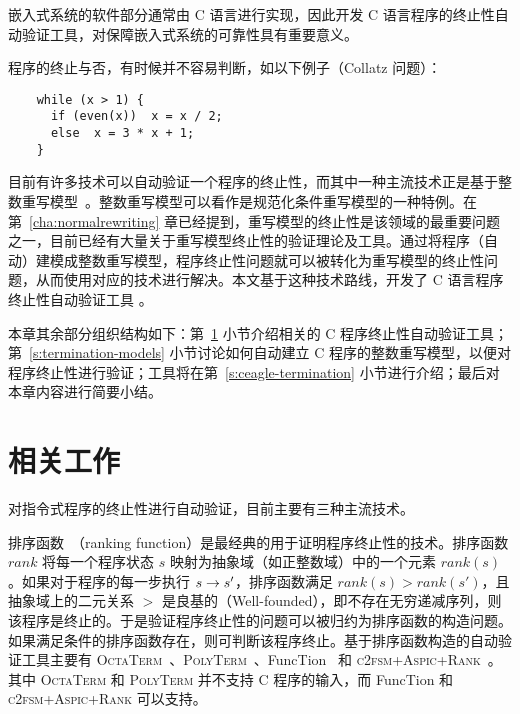 嵌入式系统的软件部分通常由 C 语言进行实现，因此开发 C 语言程序的终止性自动验证工具，对保障嵌入式系统的可靠性具有重要意义。

程序的终止与否，有时候并不容易判断，如以下例子（Collatz 问题）：
\begin{verbatim}
    while (x > 1) {
      if (even(x))  x = x / 2;
      else  x = 3 * x + 1;
    }
\end{verbatim}
目前有许多技术可以自动验证一个程序的终止性，而其中一种主流技术正是基于整数重写模型~\cite{DBLP:conf/rta/FalkeKS11}。整数重写模型可以看作是规范化条件重写模型的一种特例。在第~\ref{cha:normalrewriting} 章已经提到，重写模型的终止性是该领域的最重要问题之一，目前已经有大量关于重写模型终止性的验证理论及工具。通过将程序（自动）建模成整数重写模型，程序终止性问题就可以被转化为重写模型的终止性问题，从而使用对应的技术进行解决。本文基于这种技术路线，开发了 C 语言程序终止性自动验证工具 \CTerm。

本章其余部分组织结构如下：第~\ref{s:termination-related} 小节介绍相关的 C 程序终止性自动验证工具；第~\ref{s:termination-models} 小节讨论如何自动建立 C 程序的整数重写模型，以便对程序终止性进行验证；\CTerm 工具将在第~\ref{s:ceagle-termination} 小节进行介绍；最后对本章内容进行简要小结。 

\section{相关工作}
\label{s:termination-related}

对指令式程序的终止性进行自动验证，目前主要有三种主流技术。 

排序函数~\cite{DBLP:conf/lics/PodelskiR04}（ranking function）是最经典的用于证明程序终止性的技术。排序函数 $rank$ 将每一个程序状态 $s$ 映射为抽象域（如正整数域）中的一个元素 $rank(s)$。如果对于程序的每一步执行 $s \rightarrow s'$，排序函数满足 $rank(s) > rank(s')$，且抽象域上的二元关系 $>$ 是良基的（Well-founded），即不存在无穷递减序列，则该程序是终止的。于是验证程序终止性的问题可以被归约为排序函数的构造问题。如果满足条件的排序函数存在，则可判断该程序终止。基于排序函数构造的自动验证工具主要有 \textsc{OctaTerm}~\cite{DBLP:conf/popl/BerdineCCDO07}、\textsc{PolyTerm}~\cite{DBLP:conf/popl/BerdineCCDO07}、FuncTion~\cite{DBLP:conf/sas/Urban13,DBLP:conf/tacas/Urban15} 和 \textsc{c2fsm+Aspic+Rank}~\cite{DBLP:conf/sas/AliasDFG10}。其中 \textsc{OctaTerm} 和 \textsc{PolyTerm} 并不支持 C 程序的输入，而 FuncTion 和 \textsc{c2fsm+Aspic+Rank} 可以支持。


